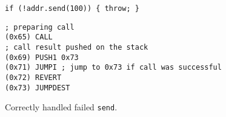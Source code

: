 \begin{figure}
  \centering
\begin{lstlisting}[language=Solidity,basicstyle=\footnotesize\ttfamily,label=fig:handled-exception-solidity,caption=Failure handling in Solidity.]
if (!addr.send(100)) { throw; }
\end{lstlisting}
\begin{lstlisting}[language=esm, basicstyle=\footnotesize\ttfamily,caption=EVM instructions for failure handling.,label=fig:handled-exception-instructions]
; preparing call
(0x65) CALL
; call result pushed on the stack
(0x69) PUSH1 0x73
(0x71) JUMPI ; jump to 0x73 if call was successful
(0x72) REVERT
(0x73) JUMPDEST
\end{lstlisting}
  \caption{Correctly handled failed \lstinline{send}.}
  \label{fig:handled-exception}
\end{figure}




